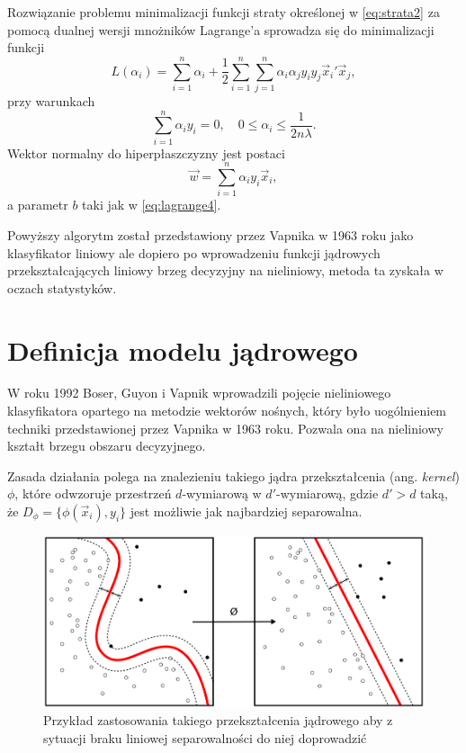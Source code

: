 \documentclass[
]{book}
\theoremstyle{plain}
\theoremstyle{definition}
\theoremstyle{definition}
\theoremstyle{definition}
\theoremstyle{definition}
\theoremstyle{remark}
\begin{document}
Rozwiązanie problemu minimalizacji funkcji straty określonej w \eqref{eq:strata2} za pomocą dualnej wersji mnożników Lagrange'a sprowadza się do minimalizacji funkcji
\begin{equation}
    L(\alpha_i) = \sum_{i=1}^{n}\alpha_i+\frac{1}{2}\sum_{i=1}^{n}\sum_{j=1}^{n}\alpha_i\alpha_jy_iy_j\vec{x}_i'\vec{x}_j,
\label{eq:strata3}  
\end{equation}
przy warunkach
\begin{equation}
    \sum_{i=1}^{n}\alpha_iy_i=0,\quad 0\leq \alpha_i\leq \frac{1}{2n\lambda}.
    \label{eq:nier2}
\end{equation}
Wektor normalny do hiperpłaszczyzny jest postaci
\begin{equation}
    \vec{w}=\sum_{i=1}^{n}\alpha_iy_i\vec{x}_i,
    \label{eq:wagi2}
\end{equation}
a parametr \(b\) taki jak w \eqref{eq:lagrange4}.

Powyższy algorytm został przedstawiony przez Vapnika w 1963 roku jako klasyfikator liniowy ale dopiero po wprowadzeniu funkcji jądrowych przekształcających liniowy brzeg decyzyjny na nieliniowy, metoda ta zyskała w oczach statystyków.

\hypertarget{definicja-modelu-jux105drowego}{%
\section{Definicja modelu jądrowego}\label{definicja-modelu-jux105drowego}}

W roku 1992 Boser, Guyon i Vapnik wprowadzili pojęcie nieliniowego klasyfikatora opartego na metodzie wektorów nośnych, który było uogólnieniem techniki przedstawionej przez Vapnika w 1963 roku. Pozwala ona na nieliniowy kształt brzegu obszaru decyzyjnego.

Zasada działania polega na znalezieniu takiego jądra przekształcenia (ang. \emph{kernel}) \(\phi\), które odwzoruje przestrzeń \(d\)-wymiarową w \(d'\)-wymiarową, gdzie \(d'>d\) taką, że \(D_{\phi}=\{\phi(\vec{x}_i), y_i\}\) jest możliwie jak najbardziej separowalna.

\begin{figure}

{\centering \includegraphics[width=13.46in]{images/Kernel_Machine} 

}

\caption{Przykład zastosowania takiego przekształcenia jądrowego aby z sytuacji braku liniowej separowalności do niej doprowadzić}\label{fig:svm3}
\end{figure}
\end{document}
